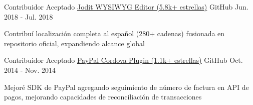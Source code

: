 \begin{cventries}
  \cventry
    {Contribuidor Aceptado} %
    {\href{https://github.com/xdan/jodit}{Jodit WYSIWYG Editor (5.8k+ estrellas)}} %
    {\faGithubSquare\acvHeaderIconSep GitHub} %
    {Jun. 2018 - Jul. 2018} %
    {
      \begin{cvitems} %
        \item {Contribuí localización completa al español (280+ cadenas) fusionada en repositorio oficial, expandiendo alcance global}
      \end{cvitems}
    }

  \cventry
    {Contribuidor Aceptado} %
    {\faPaypal \hphantom{-} \href{https://github.com/paypal/PayPal-Cordova-Plugin}{PayPal Cordova Plugin (1.1k+ estrellas)}} %
    {\faGithubSquare\acvHeaderIconSep GitHub} %
    {Oct. 2014 - Nov. 2014} %
    {
      \begin{cvitems} %
        \item {Mejoré SDK de PayPal agregando seguimiento de número de factura en API de pagos, mejorando capacidades de reconciliación de transacciones}
      \end{cvitems}
    }

\end{cventries}

